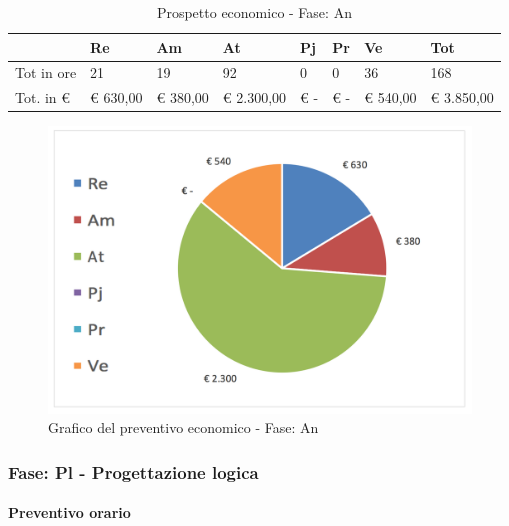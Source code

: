 							\begin{table}[H] \begin{center} \begin{tabular}{llllllll}
							\toprule
								&	\textbf{Re}	&	\textbf{Am}	&	\textbf{At}	&	\textbf{Pj}	&	\textbf{Pr}	&	\textbf{Ve}	&	\textbf{Tot}\\
							\midrule
							Tot in ore	&	21	&	19	&	92	&	0	&	0	&	36	&	168	 \\
							Tot. in €	&	 €     630,00 	 & 	 €  380,00 	 & 	 €  2.300,00 	 & 	 €           -   	 & 	 €               -   	 & 	 €  540,00 	 & 	 €        3.850,00 	 \\
							\bottomrule
							\end{tabular} \end{center} \caption{Prospetto economico - Fase:
							An
							}\label{tab:s_An} \end{table}		\begin{figure}[H]  \centering  \includegraphics[scale=0.40]{img/s_An}
									\caption{Grafico del preventivo economico - Fase: An}  \label{fig:s_An"} 		\end{figure}


		\newpage
		\subsubsection {Fase: Pl - Progettazione logica}
		\paragraph{Preventivo orario}


